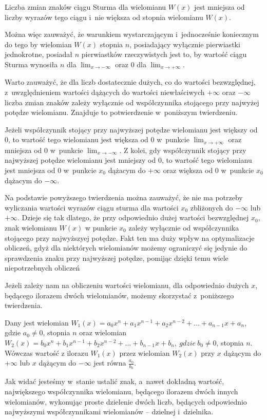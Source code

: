 \begin{theorem}
	$ $ \\
	Liczba zmian znaków ciągu Sturma dla wielomianu $W(x)$ jest mniejsza od liczby wyrazów tego ciągu i~nie większa od stopnia wielomianu $W(x)$.
\end{theorem}

Można więc zauważyć, że warunkiem wystarczającym i~jednocześnie koniecznym do tego by wielomian $W(x)$ stopnia $n$, posiadający wyłącznie pierwiastki jednokrotne, posiadał $n$ pierwiastków rzeczywistych jest to, by wartość ciągu Sturma wynosiła $n$ dla $\lim_{x \to -\infty}$ oraz $0$ dla $\lim_{x \to +\infty}$. 

Warto zauważyć, że dla liczb dostatecznie dużych, co do wartości bezwzględnej, z~uwzględnieniem wartości dążących do wartości niewłaściwych $+\infty$ oraz $-\infty$ liczba zmian znaków zależy wyłącznie od współczynnika stojącego przy najwyżej potędze wielomianu. Znajduje to potwierdzenie w~poniższym twierdzeniu.

\begin{theorem}
	$ $ \\
	Jeżeli współczynnik stojący przy najwyższej potędze wielomianu jest większy od $0$, to wartość tego wielomianu jest większa od $0$ w~punkcie $\lim_{x \to +\infty}$ oraz mniejsza od $0$ w~punkcie $\lim_{x \to -\infty}$.
	Z kolei, gdy współczynnik stojący przy najwyższej potędze wielomianu jest mniejszy od $0$, to wartość tego wielomianu jest mniejsza od $0$ w~punkcie $x_0$ dążacym do $+\infty$ oraz większa od $0$ w~punkcie $x_0$ dążacym do $-\infty$.
\end{theorem}

Na podstawie powyższego twierdzenia można zauważyć, że nie ma potrzeby wyliczania wartości wyrazów ciągu sturma dla wartości $x_0$ zbliżonych do $-\infty$ lub $+\infty.$ Dzieje się tak dlatego, że przy odpowiednio dużej wartości bezwzględnej $x_0$, znak wielomianu $W(x)$ w punkcie $x_0$ zależy wyłącznie od współczynnika stojącego przy najwyższyej potędze. Fakt ten ma duży wpływ na optymalizacje obliczeń, gdyż dla niektórych wielomianów możemy ograniczyć się jedynie do sprawdzenia znaku przy najwyższej potędze, pomijąc dzięki temu wiele niepotrzebnych obliczeń

Jeżeli zależy nam na obliczeniu wartości wielomianu, dla odpowiednio dużych $x$, będącego ilorazem dwóch wielomianów, możemy skorzystać z~poniższego twierdzenia.

\begin{theorem}
	$ $ \\
	Dany jest wielomian $W_1(x) = a_0x^n + a_1x^{n-1} + a_2x^{n-2} + ... + a_{n-1}x + a_n$, gdzie $a_0 \ne 0$, stopnia $n$ oraz wielomian $W_2(x) = b_0x^n + b_1x^{n-1} + b_2x^{n-2} + ... + b_{n-1}x + b_n,\ gdzie\ b_0 \ne 0$, stopnia $n$. Wówczas
	wartość z ilorazu $W_1(x)$ przez wielomian $W_2(x)$ przy $x$ dążącym do $+\infty$ lub $x$ dążącym do $-\infty$ jest równa $\frac{a_0}{b_0}$.
\end{theorem}

Jak widać jesteśmy w~stanie ustalić znak, a~nawet dokładną wartość, największego współczynnika wielomianu, będącego ilorazem dwóch innych wielomianów, wykonując proste dzielenie dwóch liczb, będących odpowiednio najwyższymi współczynnikami wielomianów -- dzielnej i~dzielnika.